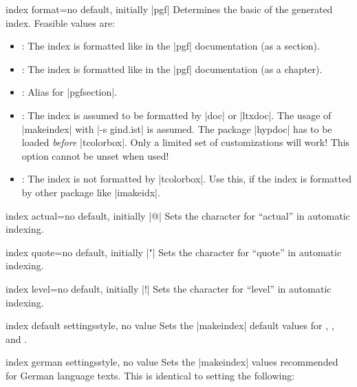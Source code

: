 \begin{docTcbKey}{index format}{=}{no default, initially |pgf|}
  Determines the basic  of the generated index.
  Feasible values are:
  \begin{itemize}
  \item{}: The index is formatted like in the |pgf| documentation (as a section).
  \item{}: The index is formatted like in the |pgf| documentation (as a chapter).
  \item{}: Alias for |pgfsection|.
  \item{}: The index is assumed to be formatted by |doc| or |ltxdoc|. The usage of |makeindex|
    with |-s gind.ist| is assumed. The package |hypdoc| has to be loaded
    \emph{before} |tcolorbox|. Only a limited set of customizations will
    work! This option cannot be unset when used!
  \item{}: The index is not formatted by |tcolorbox|. Use this, if
    the index is formatted by other package like |imakeidx|.
  \end{itemize}
\end{docTcbKey}


\begin{docTcbKey}{index actual}{=}{no default, initially |@|}
  Sets the character for \enquote{actual} in automatic indexing.
\end{docTcbKey}

\begin{docTcbKey}{index quote}{=}{no default, initially |"|}
  Sets the character for \enquote{quote} in automatic indexing.
\end{docTcbKey}

\begin{docTcbKey}{index level}{=}{no default, initially |!|}
  Sets the character for \enquote{level} in automatic indexing.
\end{docTcbKey}

\begin{docTcbKey}{index default settings}{}{style, no value}
  Sets the |makeindex| default values for
  ,
  , and
  .
\end{docTcbKey}

\enlargethispage*{1cm}

\begin{docTcbKey}{index german settings}{}{style, no value}
  Sets the |makeindex| values recommended for German language texts.
  This is identical to setting the following:
\begin{dispListing}
\end{dispListing}
\end{docTcbKey}

